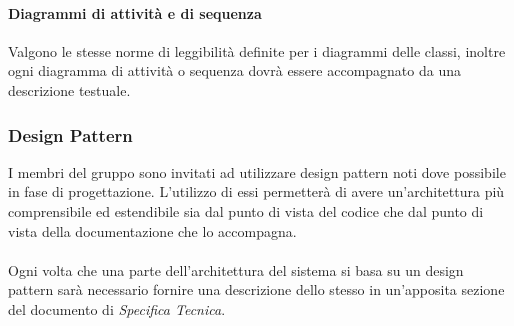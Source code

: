 \documentclass[a4paper]{article}
\begin{document}
		\paragraph{Diagrammi di attività e di sequenza}
		Valgono le stesse norme di leggibilità definite per i diagrammi delle classi, inoltre ogni diagramma di attività o sequenza dovrà essere accompagnato da una descrizione testuale.
		
		\subsubsection{Design Pattern}
		I membri del gruppo sono invitati ad utilizzare design pattern noti dove possibile in fase di progettazione. L'utilizzo di essi permetterà di avere un'architettura più comprensibile ed estendibile sia dal punto di vista del codice che dal punto di vista della documentazione che lo accompagna. \\ \\
		Ogni volta che una parte dell'architettura del sistema si basa su un design pattern sarà necessario fornire una descrizione dello stesso in un'apposita sezione del documento di \emph{Specifica Tecnica}.		
		
				
		
\end{document}
